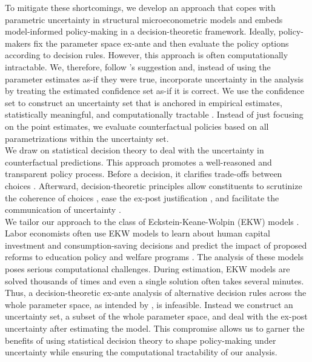 \noindent To mitigate these shortcomings, we develop an approach that copes with parametric uncertainty in structural microeconometric models and embeds model-informed policy-making in a decision-theoretic framework. Ideally, policy-makers fix the parameter space ex-ante and then evaluate the policy options according to decision rules. However, this approach is often computationally intractable. We, therefore, follow \citet{Manski.2021}'s suggestion and, instead of using the parameter estimates as-if they were true, incorporate uncertainty in the analysis by treating the estimated confidence set as-if it is correct. We use the confidence set to construct an uncertainty set that is anchored in empirical estimates, statistically meaningful, and computationally tractable \citep{Ben-Tal.2013}. Instead of just focusing on the point estimates, we evaluate counterfactual policies based on all parametrizations within the uncertainty set.\\

\noindent We draw on statistical decision theory \citep{Manski.2013} to deal with the uncertainty in counterfactual predictions. This approach promotes a well-reasoned and transparent policy process. Before a decision, it clarifies trade-offs between choices \citep{Gilboa.2018}. Afterward, decision-theoretic principles allow constituents to scrutinize the coherence of choices \citep{Gilboa.2021}, ease the ex-post justification \citep{Berger.2021}, and facilitate the communication of uncertainty \citep{Manski.2019}.\\

\noindent We tailor our approach to the class of Eckstein-Keane-Wolpin (EKW) models \citep{Aguirregabiria.2010}. Labor economists often use EKW models to learn about human capital investment and consumption-saving decisions and predict the impact of proposed reforms to education policy and welfare programs \citep{Keane.2011d,Low.2017,Blundell.2017}. The analysis of these models poses serious computational challenges. During estimation, EKW models are solved thousands of times and even a single solution often takes several minutes. Thus, a decision-theoretic ex-ante analysis of alternative decision rules across the whole parameter space, as intended by \citep{Wald.1950}, is infeasible. Instead we construct an uncertainty set, a subset of the whole parameter space, and deal with the ex-post uncertainty after estimating the model. This compromise allows us to garner the benefits of using statistical decision theory to shape policy-making under uncertainty while ensuring the computational tractability of our analysis.\\

